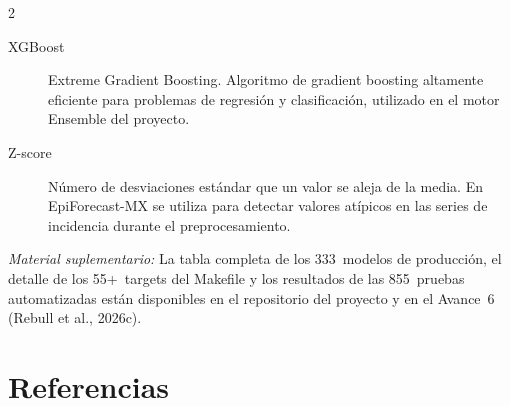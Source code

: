 \documentclass[12pt, letterpaper]{article}
\begin{document}
\begin{multicols}{2}
\begin{description}
\item[XGBoost]
Extreme Gradient Boosting. Algoritmo de gradient boosting altamente eficiente para problemas de regresión y clasificación, utilizado en el motor Ensemble del proyecto.

\item[Z-score]
Número de desviaciones estándar que un valor se aleja de la media. En EpiForecast-MX se utiliza para detectar valores atípicos en las series de incidencia durante el preprocesamiento.

\end{description}
\end{multicols}

\smallskip
\noindent\textit{Material suplementario:} La tabla completa de los 333~modelos de producción, el detalle de los 55+~targets del Makefile y los resultados de las 855~pruebas automatizadas están disponibles en el repositorio del proyecto y en el Avance~6 (Rebull et al., 2026c).

\newpage
\section{Referencias}\label{sec:referencias}
\end{document}
